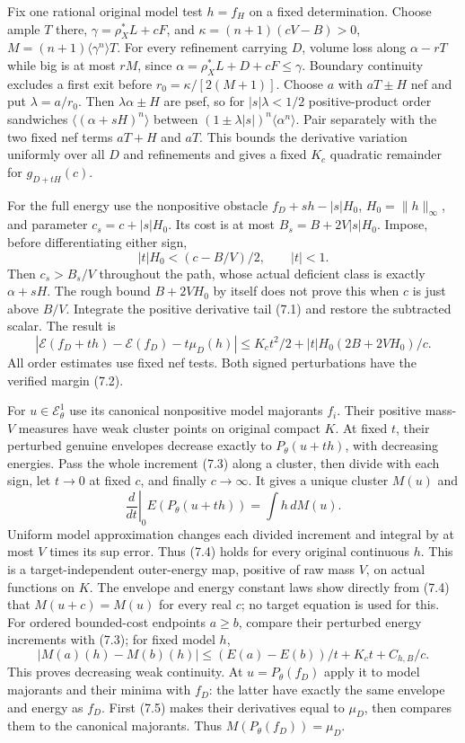 \documentclass[10pt]{article}
\newcommand{\EE}{\mathcal E^1_\theta}
\begin{document}
Fix one rational original model test $h=f_H$ on a fixed determination.
Choose ample $T$ there, $\gamma=\rho_X^*L+cF$, and
$\kappa=(n+1)(cV-B)>0$, $M=(n+1)\langle\gamma^n\rangle T$.
For every refinement carrying $D$, volume loss along $\alpha-rT$
while big is at most $rM$, since $\alpha=\rho_X^*L+D+cF\leq\gamma$.
Boundary continuity excludes a first exit before
$r_0=\kappa/[2(M+1)]$. Choose $a$ with $aT\pm H$ nef and put
$\lambda=a/r_0$. Then $\lambda\alpha\pm H$ are psef, so for
$|s|\lambda<1/2$ positive-product order sandwiches
$\langle(\alpha+sH)^n\rangle$ between
$(1\pm\lambda|s|)^n\langle\alpha^n\rangle$.
Pair separately with the two fixed nef terms $aT+H$ and $aT$.
This bounds the derivative variation uniformly over all $D$ and refinements
and gives a fixed $K_c$ quadratic remainder for $g_{D+tH}(c)$.

For the full energy use the nonpositive obstacle
$f_D+sh-|s|H_0$, $H_0=\|h\|_\infty$, and parameter
$c_s=c+|s|H_0$. Its cost is at most $B_s=B+2V|s|H_0$.
Impose, before differentiating either sign,
\[
 |t|H_0<(c-B/V)/2,\qquad |t|<1.
 \tag{7.2}
\]
Then $c_s>B_s/V$ throughout the path, whose actual deficient class is
exactly $\alpha+sH$. The rough bound $B+2VH_0$ by itself does not
prove this when $c$ is just above $B/V$. Integrate the positive derivative
tail (7.1) and restore the subtracted scalar. The result is
\[
 |\mathscr E(f_D+th)-\mathscr E(f_D)-t\mu_D(h)|
 \leq K_ct^2/2+|t|H_0(2B+2VH_0)/c.
 \tag{7.3}
\]
All order estimates use fixed nef tests. Both signed perturbations have
the verified margin (7.2).

For $u\in\EE$ use its canonical nonpositive model majorants $f_i$.
Their positive mass-$V$ measures have weak cluster points on original
compact $K$. At fixed $t$, their perturbed genuine envelopes decrease
exactly to $P_\theta(u+th)$, with decreasing energies. Pass the whole
increment (7.3) along a cluster, then divide with each sign, let $t\to0$
at fixed $c$, and finally $c\to\infty$. It gives a unique cluster $M(u)$
and
\[
 \left.\frac d{dt}\right|_0E(P_\theta(u+th))=\int h\,dM(u).
 \tag{7.4}
\]
Uniform model approximation changes each divided increment and integral
by at most $V$ times its sup error. Thus (7.4) holds for every original
continuous $h$. This is a target-independent outer-energy map, positive
of raw mass $V$, on actual functions on $K$.
The envelope and energy constant laws show directly from (7.4) that
$M(u+c)=M(u)$ for every real $c$; no target equation is used for this.
For ordered bounded-cost endpoints $a\geq b$, compare their perturbed
energy increments with (7.3); for fixed model $h$,
\[
 |M(a)(h)-M(b)(h)|\leq (E(a)-E(b))/t+K_ct+C_{h,B}/c.
 \tag{7.5}
\]
This proves decreasing weak continuity. At $u=P_\theta(f_D)$ apply
it to model majorants and their minima with $f_D$: the latter have
exactly the same envelope and energy as $f_D$. First (7.5) makes their
derivatives equal to $\mu_D$, then compares them to the canonical
majorants. Thus $M(P_\theta(f_D))=\mu_D$.
\end{document}
